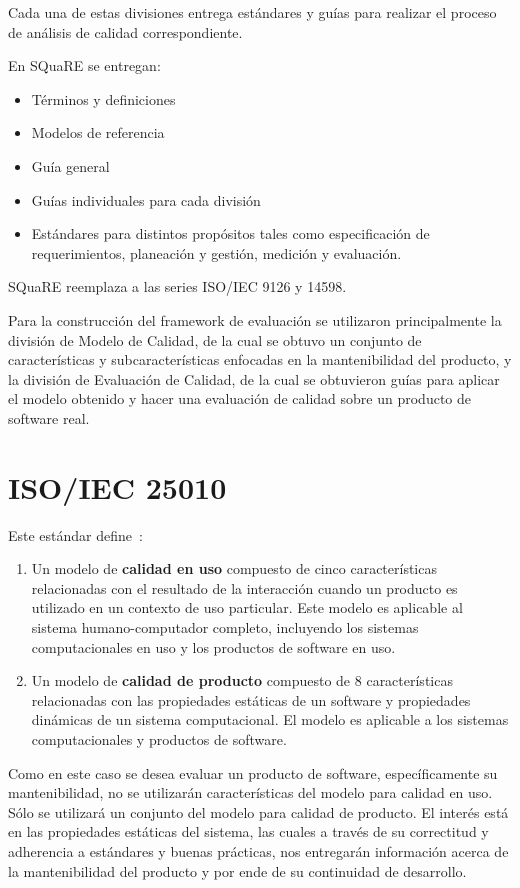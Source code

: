 Cada una de estas divisiones entrega estándares y guías para realizar
el proceso de análisis de calidad correspondiente.

En SQuaRE se entregan:
\begin{itemize}
    \item Términos y definiciones
    \item Modelos de referencia
    \item Guía general
    \item Guías individuales para cada división
    \item Estándares para distintos propósitos tales como especificación de requerimientos,
    planeación y gestión, medición y evaluación.
\end{itemize}

SQuaRE reemplaza a las series ISO/IEC 9126 y 14598.

Para la construcción del framework de evaluación se utilizaron 
principalmente la división de Modelo de Calidad, de la cual
se obtuvo un conjunto de características  y subcaracterísticas enfocadas en la mantenibilidad del 
producto, y la división de Evaluación de Calidad, de la cual se obtuvieron
guías para aplicar el modelo obtenido y hacer una evaluación de calidad
sobre un producto de software real.

\section{ISO/IEC 25010}

Este estándar define~\cite{25010}:

\begin{enumerate}
    \item Un modelo de \textbf{calidad en uso} compuesto de cinco características
    relacionadas con el resultado de la interacción cuando un producto es utilizado
    en un contexto de uso particular. Este modelo es aplicable al sistema
    humano-computador completo, incluyendo los sistemas computacionales en uso
    y los productos de software en uso.
    \item Un modelo de \textbf{calidad de producto} compuesto de 8 características relacionadas
    con las propiedades estáticas de un software y propiedades dinámicas de un sistema
    computacional. El modelo es aplicable a los sistemas computacionales y productos
    de software.
\end{enumerate}

Como en este caso se desea evaluar un producto de software, específicamente
su mantenibilidad, no se utilizarán características del modelo para calidad
en uso. Sólo se utilizará un conjunto del modelo para calidad de producto.
El interés está en las propiedades estáticas del sistema, las cuales
a través de su correctitud y adherencia a estándares y buenas prácticas, nos
entregarán información acerca de la mantenibilidad del producto y por ende
de su continuidad de desarrollo.

